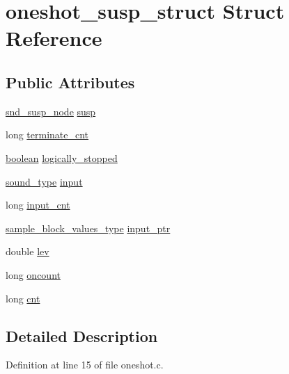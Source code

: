 \hypertarget{structoneshot__susp__struct}{}\section{oneshot\+\_\+susp\+\_\+struct Struct Reference}
\label{structoneshot__susp__struct}
\subsection*{Public Attributes}
\begin{DoxyCompactItemize}
\item 
\hyperlink{sound_8h_a6b268203688a934bd798ceb55f85d4c0}{snd\+\_\+susp\+\_\+node} \hyperlink{structoneshot__susp__struct_a3775aee003e84f341e975a5154242046}{susp}
\item 
long \hyperlink{structoneshot__susp__struct_ae423b9489d49a8c4dc7df2dfedb83b2d}{terminate\+\_\+cnt}
\item 
\hyperlink{cext_8h_a7670a4e8a07d9ebb00411948b0bbf86d}{boolean} \hyperlink{structoneshot__susp__struct_ab33f92379d6d1aedf0971de10cd211cd}{logically\+\_\+stopped}
\item 
\hyperlink{sound_8h_a792cec4ed9d6d636d342d9365ba265ea}{sound\+\_\+type} \hyperlink{structoneshot__susp__struct_a5fb337592bfb3d596a52ea1c4496186c}{input}
\item 
long \hyperlink{structoneshot__susp__struct_ada2841aa8513f42afaad0fdfb2387edc}{input\+\_\+cnt}
\item 
\hyperlink{sound_8h_a83d17f7b465d1591f27cd28fc5eb8a03}{sample\+\_\+block\+\_\+values\+\_\+type} \hyperlink{structoneshot__susp__struct_ab0e3f30f5eb9c49d2cf8854f28d2f60c}{input\+\_\+ptr}
\item 
double \hyperlink{structoneshot__susp__struct_a8406c52a939abc677c66dfa729a24a33}{lev}
\item 
long \hyperlink{structoneshot__susp__struct_a0aa3fec06068515500798883f43e95ec}{oncount}
\item 
long \hyperlink{structoneshot__susp__struct_a7ba68bbceb6b008431646991d8d26e03}{cnt}
\end{DoxyCompactItemize}


\subsection{Detailed Description}


Definition at line 15 of file oneshot.\+c.



